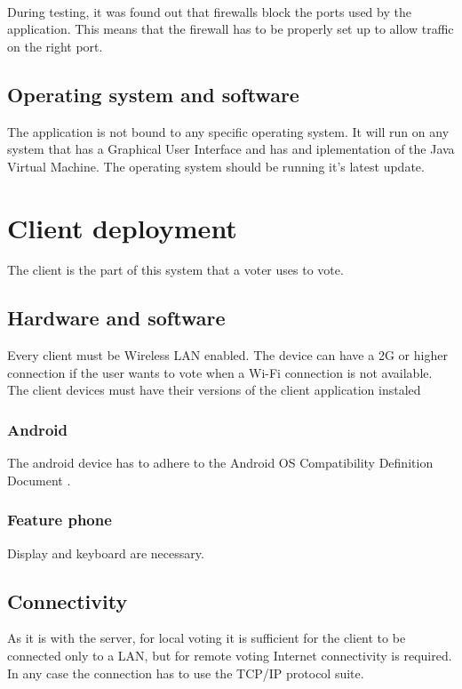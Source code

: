 \documentclass[11pt,twoside,a4paper]{book}
\begin{document}
\\

During testing, it was found out that firewalls block the ports used by the application. This means that the firewall has to be properly set up to allow traffic on the right port.
\\
\subsection{Operating system and software}
The application is not bound to any specific operating system. It will run on any system that has a Graphical User Interface and has and iplementation of the Java Virtual Machine. The operating system should be running it's latest update.

\section{Client deployment}
The client is the part of this system that a voter uses to vote.
\subsection{Hardware and software}
Every client must be Wireless LAN enabled. The device can have a 2G or higher connection if the user wants to vote when a Wi-Fi connection is not available. The client devices must have their versions of the client application instaled
\subsubsection{Android}
The android device has to adhere to the Android OS Compatibility Definition Document \cite{androCompatDef}.
\subsubsection{Feature phone}
Display and keyboard are necessary.
\subsection{Connectivity}
As it is with the server, for local voting it is sufficient for the client to be connected only to a LAN, but for remote voting Internet connectivity is required. In any case the connection has to use the TCP/IP protocol suite. 





\end{document}
